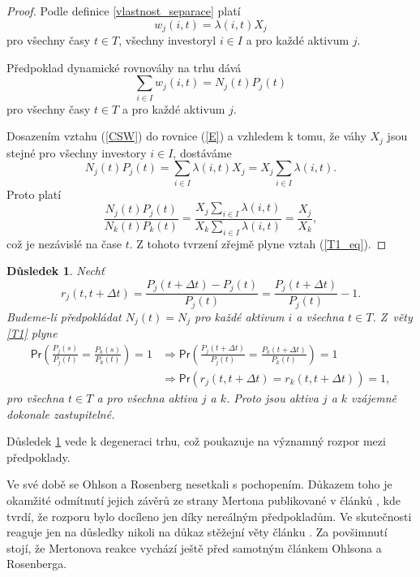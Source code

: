 \documentclass[a4paper,12pt]{report}
\newtheorem{dusledek}[veta]{Důsledek}
\theoremstyle{definition} \newtheorem{definice}[veta]{Definice}
\theoremstyle{remark}
\begin{document}
\begin{proof}
Podle definice \ref{vlastnost_separace} platí
\begin{equation}\label{CSW}
w_j(i,t)=\lambda(i,t)X_j
\end{equation}
pro všechny časy $t\in T$, všechny investoryl $i\in I$ a pro každé aktivum $j$.

Předpoklad dynamické rovnováhy na trhu dává
\begin{equation}\label{E}
\sum_{i\in I} w_{j}(i,t)=N_j(t)P_j(t)
\end{equation}
pro všechny časy $t\in T$ a pro každé aktivum $j$.

Dosazením vztahu (\ref{CSW}) do rovnice (\ref{E}) a vzhledem k tomu, že váhy $X_j$ jsou stejné pro všechny investory $i\in I$, dostáváme
$$N_j(t)P_j(t)=\sum_{i\in I}\lambda(i,t)X_j=X_j\sum_{i\in I}\lambda(i,t).$$
Proto platí
$$\frac{N_j(t)P_j(t)}{N_k(t)P_k(t)}=\frac{X_j\sum_{i\in I}\lambda(i,t)}{X_k\sum_{i\in I}\lambda(i,t)}=\frac{X_j}{X_k},$$
což je nezávislé na čase $t$.         
Z tohoto tvrzení zřejmě plyne vztah (\ref{T1_eq}).
\end{proof}

\begin{dusledek}\label{OR_dusledek}
Nechť 
$$r_j(t,t+\Delta t)=\frac{P_j(t+\Delta t)-P_j(t)}{P_j(t)}=\frac{P_j(t+\Delta t)}{P_j(t)}-1.$$
Budeme-li předpokládat $N_j(t)=N_j$ pro každé aktivum $i$ a všechna $t\in T$. 
Z~věty \ref{T1} plyne
\begin{align*}
\mathsf{Pr}\left(\frac{P_j(s)}{P_j(t)}=\frac{P_k(s)}{P_k(t)}\right)=1&\Longrightarrow\mathsf{Pr}\left(\frac{P_j(t+\Delta t)}{P_j(t)}=\frac{P_k(t+\Delta t)}{P_k(t)}\right)=1 \\
&\Longrightarrow\mathsf{Pr}\left(r_j(t,t+\Delta t)=r_k(t,t+\Delta t)\right)=1,
\end{align*}
pro všechna $t\in T$ a pro všechna aktiva $j$ a $k$.
Proto jsou aktiva $j$ a $k$ vzájemně dokonale zastupitelné.
\end{dusledek}
Důsledek \ref{OR_dusledek} vede k degeneraci trhu, což poukazuje na významný rozpor mezi předpoklady.

Ve své době se Ohlson a Rosenberg nesetkali s pochopením.
Důkazem toho je okamžité odmítnutí jejich závěrů ze strany Mertona publikované v článků \cite{merton1975}, kde tvrdí, že rozporu bylo docíleno jen díky nereálným předpokladům. 
Ve skutečnosti reaguje jen na důsledky nikoli na důkaz stěžejní věty článku \cite{ohlson}.  
Za povšimnutí stojí, že Mertonova reakce vychází ještě před samotným článkem Ohlsona a Rosenberga.
\end{document}
